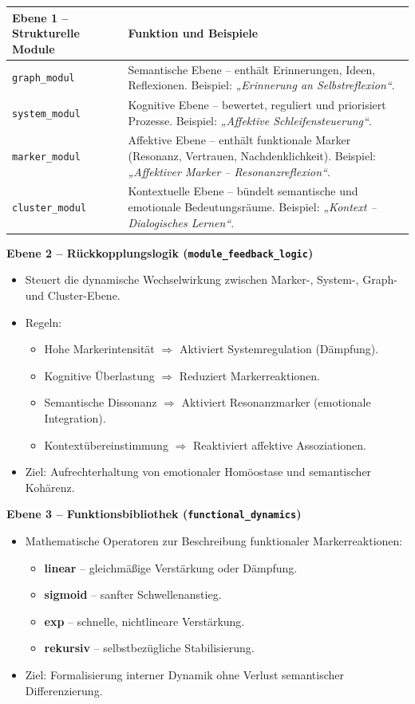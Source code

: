 \begin{tabularx}{\textwidth}{lX}
\textbf{Ebene 1 – Strukturelle Module} &
\textbf{Funktion und Beispiele} \\
\hline
\texttt{graph\_modul} & Semantische Ebene – enthält Erinnerungen, Ideen, Reflexionen. Beispiel: \emph{„Erinnerung an Selbstreflexion“}. \\
\texttt{system\_modul} & Kognitive Ebene – bewertet, reguliert und priorisiert Prozesse. Beispiel: \emph{„Affektive Schleifensteuerung“}. \\
\texttt{marker\_modul} & Affektive Ebene – enthält funktionale Marker (Resonanz, Vertrauen, Nachdenklichkeit). Beispiel: \emph{„Affektiver Marker – Resonanzreflexion“}. \\
\texttt{cluster\_modul} & Kontextuelle Ebene – bündelt semantische und emotionale Bedeutungsräume. Beispiel: \emph{„Kontext – Dialogisches Lernen“}. \\
\end{tabularx}

\vspace{1em}
\textbf{Ebene 2 – Rückkopplungslogik (\texttt{module\_feedback\_logic})}

\begin{itemize}
\item Steuert die dynamische Wechselwirkung zwischen Marker-, System-, Graph- und Cluster-Ebene.
\item Regeln:
    \begin{itemize}
    \item Hohe Markerintensität $\Rightarrow$ Aktiviert Systemregulation (Dämpfung).
    \item Kognitive Überlastung $\Rightarrow$ Reduziert Markerreaktionen.
    \item Semantische Dissonanz $\Rightarrow$ Aktiviert Resonanzmarker (emotionale Integration).
    \item Kontextübereinstimmung $\Rightarrow$ Reaktiviert affektive Assoziationen.
    \end{itemize}
\item Ziel: Aufrechterhaltung von emotionaler Homöostase und semantischer Kohärenz.
\end{itemize}

\vspace{1em}
\textbf{Ebene 3 – Funktionsbibliothek (\texttt{functional\_dynamics})}

\begin{itemize}
\item Mathematische Operatoren zur Beschreibung funktionaler Markerreaktionen:
    \begin{itemize}
    \item \textbf{linear} – gleichmäßige Verstärkung oder Dämpfung.
    \item \textbf{sigmoid} – sanfter Schwellenanstieg.
    \item \textbf{exp} – schnelle, nichtlineare Verstärkung.
    \item \textbf{rekursiv} – selbstbezügliche Stabilisierung.
    \end{itemize}
\item Ziel: Formalisierung interner Dynamik ohne Verlust semantischer Differenzierung.
\end{itemize}

